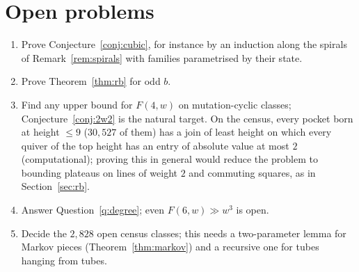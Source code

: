 \documentclass[11pt]{amsart}
\theoremstyle{definition}
\theoremstyle{remark}
\begin{document}
\section{Open problems}\label{sec:open}
\begin{enumerate}
\item Prove Conjecture~\ref{conj:cubic}, for instance by an induction along the spirals of Remark~\ref{rem:spirals} with families parametrised by their state.
\item Prove Theorem~\ref{thm:rb} for odd $b$.
\item Find any upper bound for $F(4,w)$ on mutation-cyclic classes; Conjecture~\ref{conj:2w2} is the natural target. On the census, every pocket born at height $\le9$ ($30{,}527$ of them) has a join of least height on which every quiver of the top height has an entry of absolute value at most $2$ (computational); proving this in general would reduce the problem to bounding plateaus on lines of weight $2$ and commuting squares, as in Section~\ref{sec:rb}.
\item Answer Question~\ref{q:degree}; even $F(6,w)\gg w^3$ is open.
\item Decide the $2{,}828$ open census classes; this needs a two-parameter lemma for Markov pieces (Theorem~\ref{thm:markov}) and a recursive one for tubes hanging from tubes.
\end{enumerate}

\appendix
\end{document}
